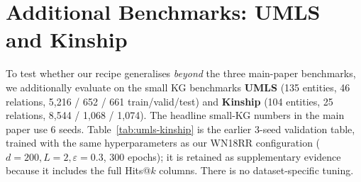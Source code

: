 \section{Additional Benchmarks: UMLS and Kinship}
\label{app:umls-kinship}

To test whether our recipe generalises \emph{beyond} the three main-paper benchmarks, we additionally evaluate on the small KG benchmarks \textbf{UMLS} (135 entities, 46 relations, 5{,}216 / 652 / 661 train/valid/test) and \textbf{Kinship} (104 entities, 25 relations, 8{,}544 / 1{,}068 / 1{,}074). The headline small-KG numbers in the main paper use 6 seeds. Table~\ref{tab:umls-kinship} is the earlier 3-seed validation table, trained with the same hyperparameters as our WN18RR configuration ($d=200, L=2, \varepsilon=0.3$, 300 epochs); it is retained as supplementary evidence because it includes the full Hits@$k$ columns. There is no dataset-specific tuning.

\begin{table}[!htb]
\centering
\caption{Preliminary UMLS and Kinship validation under our recipe (3 seeds, mean $\pm$ std). The main-paper headline uses 6 seeds; this earlier supplementary table is retained for Hits@$k$ detail. Same configuration as WN18RR main. No per-dataset tuning.}
\label{tab:umls-kinship}
\footnotesize
\setlength{\tabcolsep}{3pt}
\end{table}

